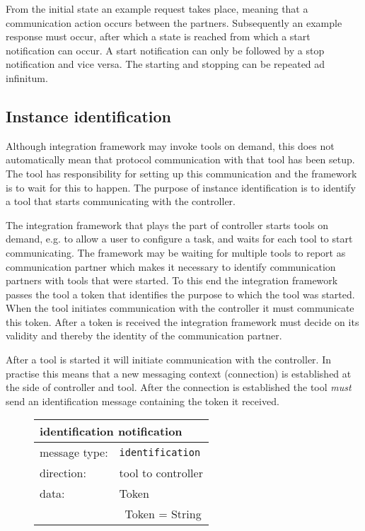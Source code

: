 \documentclass{article}
\newcommand{\msg}[1]{\texttt{#1}}
\begin{document}
   From the initial state an example request takes place, meaning that a
   communication action occurs between the partners. Subsequently an example
   response must occur, after which a state is reached from which a start
   notification can occur. A start notification can only be followed by a stop
   notification and vice versa. The starting and stopping can be repeated ad
   infinitum.

  \subsection{Instance identification} \label{s:instance_identification}

   Although integration framework may invoke tools on demand, this does not
   automatically mean that protocol communication with that tool has been
   setup. The tool has responsibility for setting up this communication and the
   framework is to wait for this to happen.  The purpose of instance
   identification is to identify a tool that starts communicating with the
   controller.
   
   The integration framework that plays the part of controller starts tools on
   demand, e.g. to allow a user to configure a task, and waits for each tool to
   start communicating. The framework may be waiting for multiple tools to
   report as communication partner which makes it necessary to identify
   communication partners with tools that were started. To this end the
   integration framework passes the tool a token that identifies the purpose to
   which the tool was started.  When the tool initiates communication with the
   controller it must communicate this token. After a token is received the
   integration framework must decide on its validity and thereby the identity
   of the communication partner.   

   After a tool is started it will initiate communication with the controller.
   In practise this means that a new messaging context (connection) is
   established at the side of controller and tool.  After the connection is
   established the tool \emph{must} send an identification message containing
   the token it received.
   
   \begin{figure}[H]
    \begin{center}
     \begin{tabular}{|ll|}
      \hline
       \multicolumn{2}{|l|}{\textbf{identification notification}} \\
      \hline
       message type:    & \msg{identification} \\
      \hline
       direction:       & tool to controller \\
       data:            & Token \\
                        & \ Token = String \\
      \hline
     \end{tabular}
     \vspace{-0.3cm}
    \end{center}
   \end{figure}
\end{document}
